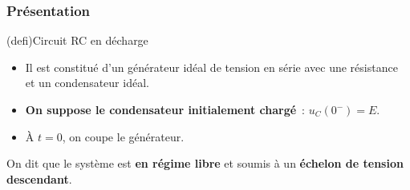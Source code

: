 \documentclass[../../main/main.tex]{subfiles}
\begin{document}
\subsubsection{Présentation}
\begin{tcb*}[sidebyside, righthand ratio=.30](defi){Circuit RC en décharge}
  \begin{itemize}
    \item Il est constitué d'un générateur idéal de tension en série avec une
          résistance et un condensateur idéal.
    \item \textbf{On suppose le condensateur initialement chargé}~: $u_C(0^-) =
            E$.
    \item À $t=0$, on coupe le générateur.
  \end{itemize}
  On dit que le système est \textbf{en régime libre} et soumis à un
  \textbf{échelon de tension descendant}.
\tcblower
  \begin{center}
\end{center}
\end{tcb*}
\end{document}

